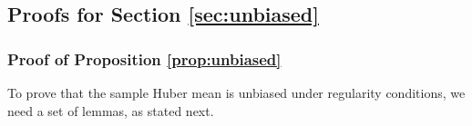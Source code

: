 \documentclass[preprint]{imsart}
\def\Frechet{Fr\'{e}chet}
\theoremstyle{plain}
\theoremstyle{remark}
\begin{document}
\begin{appendix}
\subsection{Proofs for Section \ref{sec:unbiased}}


\subsubsection{Proof of Proposition \ref{prop:unbiased}}

To prove that the sample Huber mean is unbiased under regularity conditions, we need a set of lemmas, as stated next.



\end{appendix}
\end{document}
